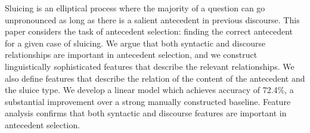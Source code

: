 Sluicing is an elliptical process where the majority of a question can go unpronounced as long as there is a salient antecedent in previous discourse. This paper considers the task of antecedent selection: finding the correct antecedent for a given case of sluicing. We argue that both syntactic and discourse relationships are important in antecedent selection, and we construct linguistically sophisticated features that describe the relevant relationships. We also define features that describe the relation of the content of the antecedent and the sluice type. We develop a linear model which achieves accuracy of 72.4\%, a substantial improvement over a strong manually constructed baseline. Feature analysis confirms that both syntactic and discourse features are important in antecedent selection.
